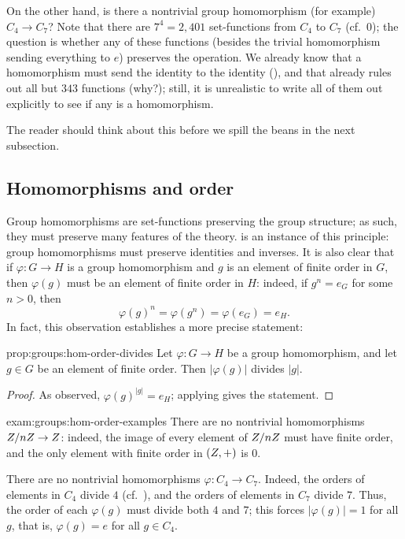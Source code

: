 On the other hand, is there a nontrivial group homomorphism (for
example) $C_4 \to C_7$? Note that there are $7^4 = 2{,}401$
set-functions from $C_4$ to $C_7$ (cf.\
0); the question is whether any of
these functions (besides the trivial homomorphism sending everything
to $e$) preserves the operation. We already know that a homomorphism
must send the identity to the identity
(), and that already rules
out all but $343$ functions (why?); still, it is unrealistic to write
all of them out explicitly to see if any is a homomorphism.

The reader should think about this before we spill the beans in the
next subsection.

\subsection{Homomorphisms and order}
\label{subsec:groups:homomorphisms-and-order}
Group homomorphisms are set-functions preserving the group structure;
as such, they must preserve many features of the
theory.  is an instance of
this principle: group homomorphisms must preserve identities and
inverses. It is also clear that if $\varphi : G \to H$ is a group
homomorphism and $g$ is an element of finite order in $G$, then
$\varphi(g)$ must be an element of finite order in $H$: indeed, if
$g^n = e_G$ for some $n > 0$, then
\[
  \varphi(g)^n = \varphi(g^n) = \varphi(e_G) = e_H.
\]
In fact, this observation establishes a more precise statement:
\begin{prop}{}{prop:groups:hom-order-divides}
  Let $\varphi : G \to H$ be a group homomorphism, and let
    $g \in G$ be an element of finite order. Then $|\varphi(g)|$
    divides $|g|$.
\end{prop}
\begin{proof}
  As observed, $\varphi(g)^{|g|} = e_H$; applying
   gives the statement.
\end{proof}
\begin{exam}{}{exam:groups:hom-order-examples}
  There are no nontrivial homomorphisms $Z/nZ \to Z$: indeed, the
  image of every element of $Z/nZ$ must have finite order, and the
  only element with finite order in $(Z, +)$ is $0$.

  There are no nontrivial homomorphisms $\varphi : C_4 \to
  C_7$. Indeed, the orders of elements in $C_4$ divide $4$ (cf.\
  ), and the orders of elements in $C_7$
  divide $7$. Thus, the order of each $\varphi(g)$ must divide both
  $4$ and $7$; this forces $|\varphi(g)| = 1$ for all $g$, that is,
  $\varphi(g) = e$ for all $g \in C_4$.
\end{exam}

